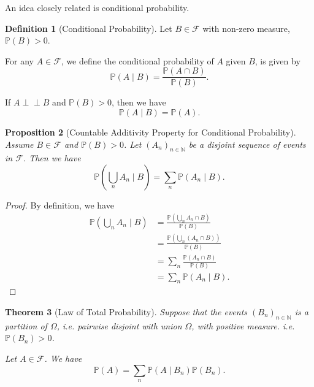 \documentclass[11pt]{article}
\numberwithin{equation}{section}
\newtheorem{theorem}{Theorem}[section]
\newtheorem{proposition}[theorem]{Proposition}
\theoremstyle{definition}
\newtheorem{definition}[theorem]{Definition}
\theoremstyle{remark}
\newcommand{\pqty}[1]{\left(#1\right)}
\newcommand{\NN}{\mathbb N}
\newcommand{\eventSpace}{\mathcal F}
\newcommand{\Prob}{\mathbb P}
\newcommand{\indp}{\mathrel{\perp\!\!\!\perp}}
\newcommand{\Conditional}[2]{#1\mid #2}
\begin{document}
An idea closely related is conditional probability.

\begin{definition}[Conditional Probability]\label{probability-definition-009}
    \label{probability-def:conditional-prob}%
    Let \(B \in \eventSpace\) with non-zero measure, \(\Prob\pqty{B} > 0\).

    For any \(A \in \eventSpace\), we define the conditional probability of \(A\) given \(B\), is given by
    \[
        \Prob\pqty{\Conditional{A}{B}} = \frac{\Prob\pqty{A \cap B}}{\Prob\pqty{B}}.
    \]
\end{definition}

If \(A \indp B\) and \(\Prob(B)>0\), then we have
\[
    \Prob\pqty{\Conditional{A}{B}} = \Prob\pqty{A}.
\]

\begin{proposition}[Countable Additivity Property for Conditional Probability]\label{probability-proposition-006}
    \label{probability-prop:countable-additivity-conditional}%
Assume \(B\in\eventSpace\) and \(\Prob(B)>0\).
    Let \(\pqty{A_n}_{n \in \NN}\) be a disjoint sequence of events in \(\eventSpace\). Then we have
    \[
        \Prob\pqty{\Conditional{\bigcup_n A_n}{B}} = \sum_{n} \Prob\pqty{\Conditional{A_n}{B}}.
    \]
\end{proposition}

\begin{proof}\label{probability-proof-014}
    By definition, we have
    \begin{align*}
        \Prob\pqty{\Conditional{\bigcup_{n} A_n}{B}} &= \frac{\Prob\pqty{\bigcup_n A_n \cap B}}{\Prob\pqty{B}} \\
        &= \frac{\Prob\pqty{\bigcup_n \pqty{A_n \cap B}}}{\Prob\pqty{B}} \\
        &= \sum_{n} \frac{\Prob\pqty{A_n \cap B}}{\Prob\pqty{B}} \\
        &= \sum_{n} \Prob\pqty{\Conditional{A_n}{B}}.
    \end{align*}
\end{proof}

\begin{theorem}[Law of Total Probability]\label{probability-theorem-003}
    \label{probability-thm:law-total-probability}%
    Suppose that the events \(\pqty{B_n}_{n \in \NN}\) is a \emph{partition} of \(\Omega\), i.e. pairwise disjoint with union \(\Omega\), with positive measure. i.e. \(\Prob\pqty{B_n} > 0\).

    Let \(A \in \eventSpace\). We have
    \[
        \Prob\pqty{A} = \sum_{n} \Prob\pqty{\Conditional{A}{B_n}} \Prob\pqty{B_n}.
    \]
\end{theorem}
\end{document}
